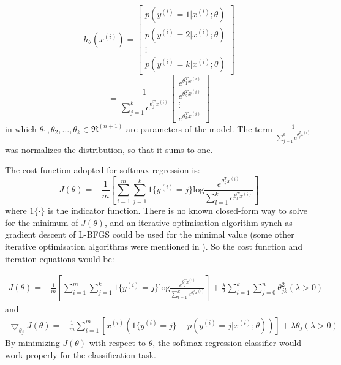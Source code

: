 \documentclass{bmcart}
\begin{document}
\begin{equation}
h_{\theta}(x^{(i)}) = 
\left[
      \begin{array}{cccccc}
        p(y^{(i)}=1|x^{(i)};\theta) \\
        p(y^{(i)}=2|x^{(i)};\theta) \\
        \vdots \\
        p(y^{(i)}=k|x^{(i)};\theta)
      \end{array}
    \right]
\end{equation}
\begin{equation}
= \frac{1}{\sum_{j=1}^ke^{\theta_j^Tx^{(i)}}}
\left[
      \begin{array}{cccccc}
        e^{\theta_1^Tx^{(i)}}\\
        e^{\theta_2^Tx^{(i)}}\\
        \vdots \\
        e^{\theta_k^Tx^{(i)}}
      \end{array}
    \right]
\end{equation}
\noindent in which $\theta_1,\theta_2,\ldots,\theta_k \in \Re^{(n+1)}$ are parameters of the model. The term $\frac{1}{\sum_{j=1}^ke^{\theta_j^Tx^{(i)}}}$ was normalizes the distribution, so that it sums to one.

The cost function adopted for softmax regression is:
\begin{equation}
J(\theta) = -\frac{1}{m}[\sum_{i=1}^m\sum_{j=1}^k1\{y^{(i)}=j\}\text{log}{\frac{e^{\theta_j^Tx^{(i)}}}{\sum_{l=1}^ke^{\theta_l^Tx^{(i)}}}}]
\end{equation}
where $1\{\cdot\}$ is the indicator function.
There is no known closed-form way to solve for the minimum of $J(\theta)$, and an iterative optimisation algorithm synch as gradient descent of L-BFGS could be used for the minimal value (some other iterative optimisation algorithms were mentioned in \cite{ngiam2011optimization}).
So the cost function and iteration equations would be:

\begin{equation}
\begin{split}
J(\theta) = -\frac{1}{m}[\sum_{i=1}^m\sum_{j=1}^k1\{y^{(i)}=j\}\text{log}{\frac{e^{\theta_j^Tx^{(i)}}}{\sum_{l=1}^ke^{\theta_l^Tx^{(i)}}}}] 
+ \frac{\lambda}{2} \sum_{i=1}^k \sum_{j=0}^n \theta_{jk}^2 (\lambda>0)
\end{split}
\end{equation}
and
\begin{equation}
\begin{split}
\bigtriangledown_{\theta_j}J(\theta) = -\frac{1}{m}\sum_{i=1}^m[x^{(i)}(1\{y^{(i)}=j\}-p(y^{(i)}=j|x^{(i)};\theta))] 
+ \lambda\theta_j  (\lambda>0)
\end{split}
\end{equation}
By minimizing $J(\theta)$ with respect to $\theta$, the softmax regression classifier would work properly for the classification task.
\end{document}
